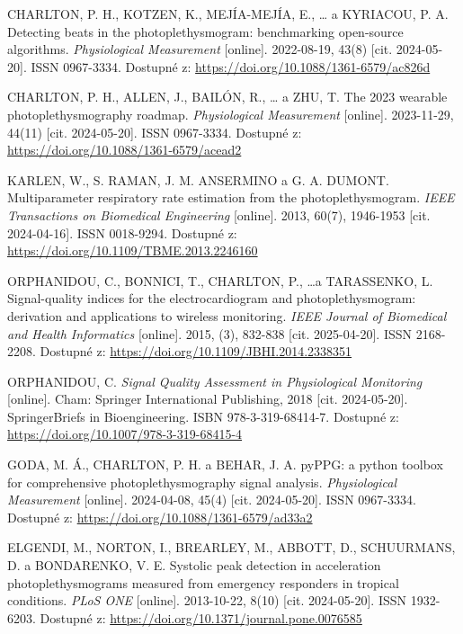 \begin{thebibliography}{99}
		CHARLTON, P. H., KOTZEN, K., MEJÍA-MEJÍA, E., … a KYRIACOU, P. A.
		Detecting beats in the photoplethysmogram: benchmarking open-source algorithms.
		\emph{Physiological Measurement} [online].
		2022-08-19, 43(8) [cit. 2024-05-20].
		ISSN 0967-3334.
		Dostupné z: \url{https://doi.org/10.1088/1361-6579/ac826d}

		CHARLTON, P. H., ALLEN, J., BAILÓN, R., … a ZHU, T.
		The 2023 wearable photoplethysmography roadmap.
		\emph{Physiological Measurement} [online].
		2023-11-29, 44(11) [cit. 2024-05-20].
		ISSN 0967-3334.
		Dostupné z: \url{https://doi.org/10.1088/1361-6579/acead2}

		KARLEN, W., S. RAMAN, J. M. ANSERMINO a G. A. DUMONT.
		Multiparameter respiratory rate estimation from the photoplethysmogram.
		\emph{IEEE Transactions on Biomedical Engineering} [online].
		2013, 60(7), 1946-1953 [cit. 2024-04-16].
		ISSN 0018-9294.
		Dostupné z: \url{https://doi.org/10.1109/TBME.2013.2246160}

		ORPHANIDOU, C., BONNICI, T., CHARLTON, P., \dots a TARASSENKO, L.
		Signal-quality indices for the electrocardiogram and photoplethysmogram: derivation and applications to wireless monitoring.
		\emph{IEEE Journal of Biomedical and Health Informatics} [online].
		2015, (3), 832-838 [cit. 2025-04-20].
		ISSN 2168-2208.
		Dostupné z: \url{https://doi.org/10.1109/JBHI.2014.2338351}

		ORPHANIDOU, C.
		\emph{Signal Quality Assessment in Physiological Monitoring} [online].
		Cham: Springer International Publishing, 2018 [cit. 2024-05-20].
		SpringerBriefs in Bioengineering.
		ISBN 978-3-319-68414-7.
		Dostupné z: \url{https://doi.org/10.1007/978-3-319-68415-4}

		GODA, M. Á., CHARLTON, P. H. a BEHAR, J. A.
		pyPPG: a python toolbox for comprehensive photoplethysmography signal analysis.
		\emph{Physiological Measurement} [online].
		2024-04-08, 45(4) [cit. 2024-05-20].
		ISSN 0967-3334.
		Dostupné z: \url{https://doi.org/10.1088/1361-6579/ad33a2}

		ELGENDI, M., NORTON, I., BREARLEY, M., ABBOTT, D., SCHUURMANS, D. a BONDARENKO, V. E.
		Systolic peak detection in acceleration photoplethysmograms measured from emergency responders in tropical conditions.
		\emph{PLoS ONE} [online].
		2013-10-22, 8(10) [cit. 2024-05-20].
		ISSN 1932-6203.
		Dostupné z: \url{https://doi.org/10.1371/journal.pone.0076585}


\end{thebibliography}

